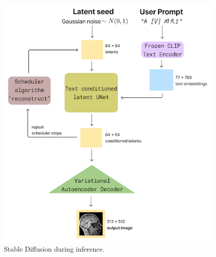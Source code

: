 \begin{figure}[H] 
\centering
\includegraphics[width=\columnwidth]{main/content/images/diagrams/sd_inference.png}
\caption{Stable Diffusion during inference.}
\label{fig:sd_inference}
\end{figure}